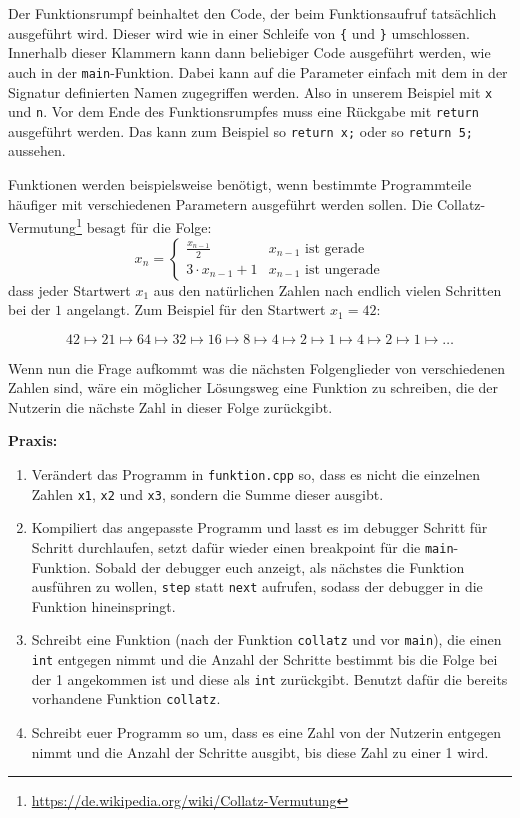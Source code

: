 Der Funktionsrumpf beinhaltet den Code, der beim Funktionsaufruf tatsächlich ausgeführt wird.
Dieser wird wie in einer Schleife von \texttt{\{} und \texttt{\}} umschlossen.
Innerhalb dieser Klammern kann dann beliebiger Code ausgeführt werden, wie auch in der \texttt{main}-Funktion.
Dabei kann auf die Parameter einfach mit dem in der Signatur definierten Namen zugegriffen werden.
Also in unserem Beispiel mit \texttt{x} und \texttt{n}.
Vor dem Ende des Funktionsrumpfes muss eine Rückgabe mit \texttt{return} ausgeführt werden.
Das kann zum Beispiel so \texttt{return x;} oder so \texttt{return 5;} aussehen.

Funktionen werden beispielsweise benötigt, wenn bestimmte Programmteile häufiger mit verschiedenen Parametern ausgeführt werden sollen.
Die Collatz-Vermutung\footnote{\url{https://de.wikipedia.org/wiki/Collatz-Vermutung}} besagt für die Folge:
\[
	x_n =
	\begin{cases}
		\frac{x_{n-1}}{2} & x_{n-1} \text{ ist gerade} \\
		3 \cdot x_{n-1} + 1 & x_{n-1} \text{ ist ungerade}
	\end{cases}
\]
dass jeder Startwert $x_1$ aus den natürlichen Zahlen nach endlich vielen Schritten bei der $1$ angelangt.
Zum Beispiel für den Startwert $x_1 = 42$:

\[
    42 \mapsto 21 \mapsto 64 \mapsto 32 \mapsto 16 \mapsto 8 \mapsto 4 \mapsto 2 \mapsto 1 \mapsto 4 \mapsto 2 \mapsto 1 \mapsto \ldots
\]

Wenn nun die Frage aufkommt was die nächsten Folgenglieder von verschiedenen Zahlen sind, wäre ein möglicher Lösungsweg eine Funktion zu schreiben, die der Nutzerin die nächste Zahl in dieser Folge zurückgibt.


\textbf{Praxis:}
\begin{enumerate}
	\item Verändert das Programm in \texttt{funktion.cpp} so, dass es nicht die einzelnen Zahlen \texttt{x1}, \texttt{x2} und \texttt{x3}, sondern die Summe dieser ausgibt.
	\item Kompiliert das angepasste Programm und lasst es im debugger Schritt für Schritt durchlaufen, setzt dafür wieder einen breakpoint für die \texttt{main}-Funktion.
	    Sobald der debugger euch anzeigt, als nächstes die Funktion ausführen zu wollen, \texttt{step} statt \texttt{next} aufrufen, sodass der debugger in die Funktion hineinspringt.
	\item Schreibt eine Funktion (nach der Funktion \texttt{collatz} und vor \texttt{main}), die einen \texttt{int} entgegen nimmt und die Anzahl der Schritte bestimmt bis die Folge bei der 1 angekommen ist und diese als \texttt{int} zurückgibt.
	    Benutzt dafür die bereits vorhandene Funktion \texttt{collatz}.
	\item Schreibt euer Programm so um, dass es eine Zahl von der Nutzerin entgegen nimmt und die Anzahl der Schritte ausgibt, bis diese Zahl zu einer 1 wird.
\end{enumerate}

